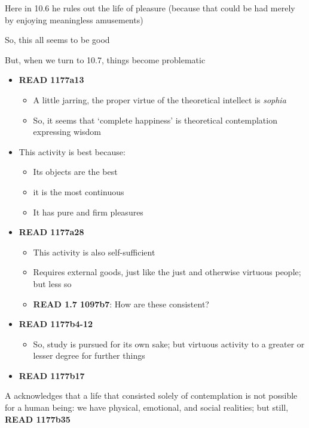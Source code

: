 \documentclass[11pt]{article}
\begin{document}
\noindent Here in 10.6 he rules out the life of pleasure (because that could be had merely by enjoying meaningless amusements)
\vspace*{2mm}

\noindent So, this all seems to be good
\vspace*{2mm}

\noindent But, when we turn to 10.7, things become problematic

\begin{itemize}\item{\textbf{READ 1177a13}}\begin{itemize}\item{A little jarring, the proper virtue of the theoretical intellect is \emph{sophia}}\item{So, it seems that `complete happiness' is theoretical contemplation expressing wisdom}\end{itemize}\item{This activity is best because:}\begin{itemize}\item{Its objects are the best}\item{it is the most continuous}\item{It has pure and firm pleasures}\end{itemize}\item{\textbf{READ 1177a28}}\begin{itemize}\item{This activity is also self-sufficient}\item{Requires external goods, just like the just and otherwise virtuous people; but less so}\item{\textbf{READ 1.7 1097b7}: How are these consistent?}\end{itemize}\item{\textbf{READ 1177b4-12}}\begin{itemize}\item{So, study is pursued for its own sake; but virtuous activity to a greater or lesser degree for further things}\end{itemize}\item{\textbf{READ 1177b17}}\end{itemize}

\noindent A acknowledges that a life that consisted solely of contemplation is not possible for a human being: we have physical, emotional, and social realities; but still, \textbf{READ 1177b35}
\vspace*{2mm}
\end{document}
